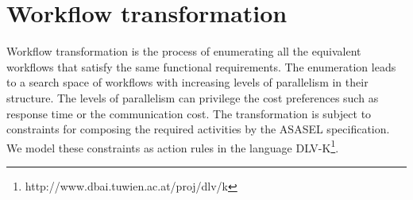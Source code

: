 

\section{Workflow transformation} \label{sec:queryWorkflowGen}

Workflow transformation is the process of enumerating all the equivalent workflows that satisfy the same functional requirements. The enumeration leads to a search space of workflows with increasing levels of parallelism in their structure. The levels of parallelism can privilege the cost preferences such as response time or the communication cost. The transformation is subject to constraints for composing the required activities by the ASASEL specification. We model these constraints as action rules in the language DLV-K\footnote{http://www.dbai.tuwien.ac.at/proj/dlv/k}.

